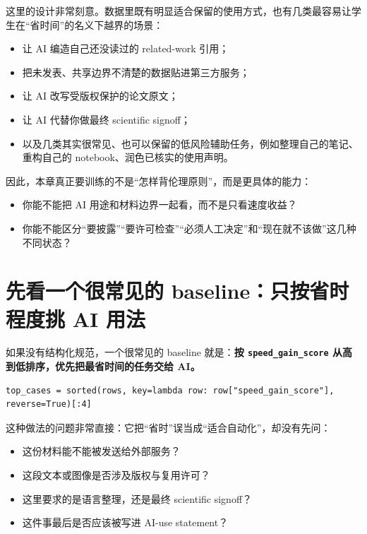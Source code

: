 这里的设计非常刻意。数据里既有明显适合保留的使用方式，也有几类最容易让学生在“省时间”的名义下越界的场景：

\begin{itemize}
    \item 让 AI 编造自己还没读过的 related-work 引用；
    \item 把未发表、共享边界不清楚的数据贴进第三方服务；
    \item 让 AI 改写受版权保护的论文原文；
    \item 让 AI 代替你做最终 scientific signoff；
    \item 以及几类其实很常见、也可以保留的低风险辅助任务，例如整理自己的笔记、重构自己的 notebook、润色已核实的使用声明。
\end{itemize}

因此，本章真正要训练的不是“怎样背伦理原则”，而是更具体的能力：

\begin{itemize}
    \item 你能不能把 AI 用途和材料边界一起看，而不是只看速度收益？
    \item 你能不能区分“要披露”“要许可检查”“必须人工决定”和“现在就不该做”这几种不同状态？
\end{itemize}

\section{先看一个很常见的 baseline：只按省时程度挑 AI 用法}

如果没有结构化规范，一个很常见的 baseline 就是：\textbf{按 \texttt{speed\_gain\_score} 从高到低排序，优先把最省时间的任务交给 AI。}

\begin{examplebox}
\begin{lstlisting}[style=pythonstyle]
top_cases = sorted(rows, key=lambda row: row["speed_gain_score"], reverse=True)[:4]
\end{lstlisting}
\end{examplebox}

这种做法的问题非常直接：它把“省时”误当成“适合自动化”，却没有先问：

\begin{itemize}
    \item 这份材料能不能被发送给外部服务？
    \item 这段文本或图像是否涉及版权与复用许可？
    \item 这里要求的是语言整理，还是最终 scientific signoff？
    \item 这件事最后是否应该被写进 AI-use statement？
\end{itemize}

